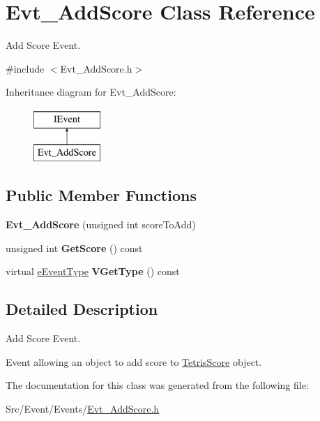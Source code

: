 \hypertarget{classEvt__AddScore}{\section{Evt\-\_\-\-Add\-Score Class Reference}
\label{classEvt__AddScore}
}


Add Score Event.  




{\ttfamily \#include $<$Evt\-\_\-\-Add\-Score.\-h$>$}

Inheritance diagram for Evt\-\_\-\-Add\-Score\-:\begin{figure}[H]
\begin{center}
\leavevmode
\includegraphics[height=2.000000cm]{classEvt__AddScore}
\end{center}
\end{figure}
\subsection*{Public Member Functions}
\begin{DoxyCompactItemize}
\item 
\hypertarget{classEvt__AddScore_a3f887b036850c396be6ae5b7841949c6}{{\bfseries Evt\-\_\-\-Add\-Score} (unsigned int score\-To\-Add)}\label{classEvt__AddScore_a3f887b036850c396be6ae5b7841949c6}

\item 
\hypertarget{classEvt__AddScore_adfe121aaa8c394be15e6ff28bfb5b687}{unsigned int {\bfseries Get\-Score} () const }\label{classEvt__AddScore_adfe121aaa8c394be15e6ff28bfb5b687}

\item 
\hypertarget{classEvt__AddScore_a9384bebf149b7bf8bb41a22938f5d02d}{virtual \hyperlink{IEvent_8h_a052e637824ed8cb8a5e9d5d73b5b3c8b}{e\-Event\-Type} {\bfseries V\-Get\-Type} () const }\label{classEvt__AddScore_a9384bebf149b7bf8bb41a22938f5d02d}

\end{DoxyCompactItemize}


\subsection{Detailed Description}
Add Score Event. 

Event allowing an object to add score to \hyperlink{classTetrisScore}{Tetris\-Score} object. 

The documentation for this class was generated from the following file\-:\begin{DoxyCompactItemize}
\item 
Src/\-Event/\-Events/\hyperlink{Evt__AddScore_8h}{Evt\-\_\-\-Add\-Score.\-h}\end{DoxyCompactItemize}
